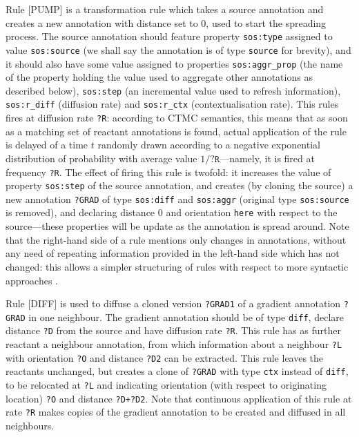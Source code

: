\documentclass[12pt,a4paper,twoside,openright]{book}
\begin{document}
Rule [PUMP] is a transformation rule which takes a source annotation and creates a new annotation with distance set to $0$, used to start the spreading process.
%
The source annotation should feature property \texttt{sos:type} assigned to value \texttt{sos:source} (we shall say the annotation is of type \texttt{source} for brevity), and it should also have some value assigned to properties \texttt{sos:aggr\_prop} (the name of the property holding the value used to aggregate other annotations as described below), \texttt{sos:step} (an incremental value used to refresh information), \texttt{sos:r\_diff} (diffusion rate) and \texttt{sos:r\_ctx} (contextualisation rate).
%
This rules fires at diffusion rate \texttt{?R}: according to CTMC semantics, this means that as soon as a matching set of reactant annotations is found, actual application of the rule is delayed of a time $t$ randomly drawn according to a negative exponential distribution of probability with average value $1/\texttt{?R}$---namely, it is fired at frequency \texttt{?R}.
%
The effect of firing this rule is twofold: it increases the value of property \texttt{sos:step} of the source annotation, and creates (by cloning the source) a new annotation \texttt{?GRAD} of type \texttt{sos:diff} and \texttt{sos:aggr} (original type \texttt{sos:source} is removed), and declaring distance $0$ and orientation \texttt{here} with respect to the source---these properties will be update as the annotation is spread around.
%
Note that the right-hand side of a rule mentions only changes in annotations, without any need of repeating information provided in the left-hand side which has not changed: this allows a simpler structuring of rules with respect to more syntactic approaches \cite{mass2011}.

Rule [DIFF] is used to diffuse a cloned version \texttt{?GRAD1} of a gradient annotation \texttt{?GRAD} in one neighbour.
%
The gradient annotation should be of type \texttt{diff}, declare distance \texttt{?D} from the source and have diffusion rate \texttt{?R}.
%
This rule has as further reactant a neighbour annotation, from which information about a neighbour \texttt{?L} with orientation \texttt{?O} and distance \texttt{?D2} can be extracted.
%
This rule leaves the reactants unchanged, but creates a clone of \texttt{?GRAD} with type \texttt{ctx} instead of \texttt{diff}, to be relocated at \texttt{?L} and indicating orientation (with respect to originating location) \texttt{?O} and distance \texttt{?D+?D2}.
%
Note that continuous application of this rule at rate \texttt{?R} makes copies of the gradient annotation to be created and diffused in all neighbours.
\end{document}
